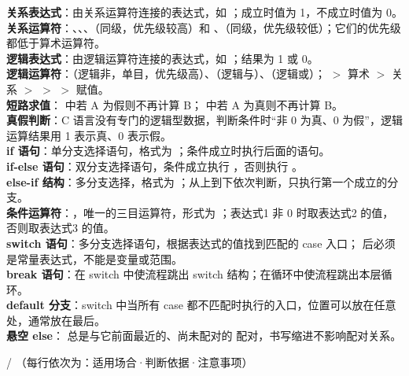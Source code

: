 \documentclass[a4paper,11pt]{article}
\begin{document}
\begin{keyterms}
\textbf{关系表达式}：由关系运算符连接的表达式，如 ；成立时值为 1，不成立时值为 0。\\
\textbf{关系运算符}：\code{<}、\code{<=}、\code{>}、\code{>=}（同级，优先级较高）和 \code{==}、\code{!=}（同级，优先级较低）；它们的优先级都低于算术运算符。\\
\textbf{逻辑表达式}：由逻辑运算符连接的表达式，如 ；结果为 1 或 0。\\
\textbf{逻辑运算符}：\code{!}（逻辑非，单目，优先级高）、\code{\&\&}（逻辑与）、\code{||}（逻辑或）；\code{!} $>$ 算术 $>$ 关系 $>$ \code{\&\&} $>$ \code{||} $>$ 赋值。\\
\textbf{短路求值}： 中若 A 为假则不再计算 B； 中若 A 为真则不再计算 B。\\
\textbf{真假判断}：C 语言没有专门的逻辑型数据，判断条件时“非 0 为真、0 为假”，逻辑运算结果用 1 表示真、0 表示假。\\
\textbf{if 语句}：单分支选择语句，格式为 ；条件成立时执行后面的语句。\\
\textbf{if-else 语句}：双分支选择语句，条件成立执行 ，否则执行 。\\
\textbf{else-if 结构}：多分支选择，格式为 ；从上到下依次判断，只执行第一个成立的分支。\\
\textbf{条件运算符}：，唯一的三目运算符，形式为 ；表达式1 非 0 时取表达式2 的值，否则取表达式3 的值。\\
\textbf{switch 语句}：多分支选择语句，根据表达式的值找到匹配的 case 入口； 后必须是常量表达式，不能是变量或范围。\\
\textbf{break 语句}：在 switch 中使流程跳出 switch 结构；在循环中使流程跳出本层循环。\\
\textbf{default 分支}：switch 中当所有 case 都不匹配时执行的入口，位置可以放在任意处，通常放在最后。\\
\textbf{悬空 else}： 总是与它前面最近的、尚未配对的  配对，书写缩进不影响配对关系。
\end{keyterms}

\begin{contrast}{ / （每行依次为：适用场合·判断依据·注意事项）}
\end{contrast}
\end{document}

